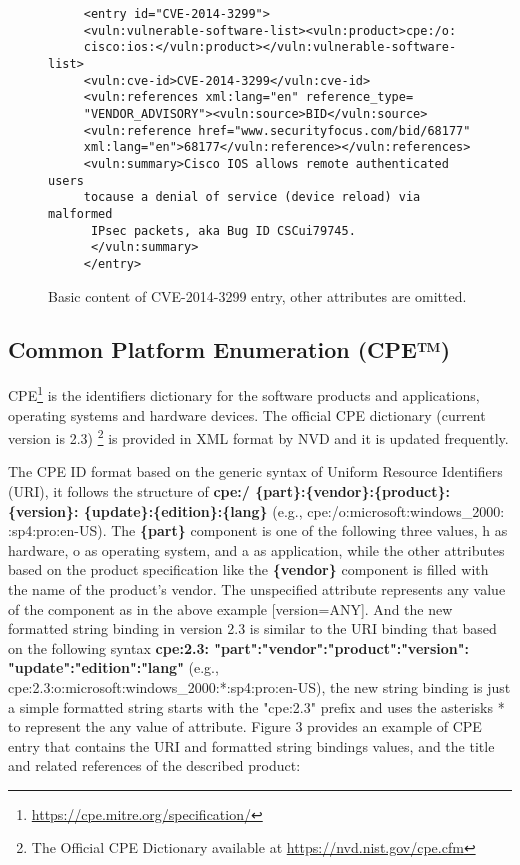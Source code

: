 \documentclass{llncs}
\begin{document}
 \begin{figure}
   
      \lstset{language=XML}
       \begin{lstlisting}
     <entry id="CVE-2014-3299">
     <vuln:vulnerable-software-list><vuln:product>cpe:/o:
     cisco:ios:</vuln:product></vuln:vulnerable-software-list>
     <vuln:cve-id>CVE-2014-3299</vuln:cve-id>
     <vuln:references xml:lang="en" reference_type=
     "VENDOR_ADVISORY"><vuln:source>BID</vuln:source>
     <vuln:reference href="www.securityfocus.com/bid/68177"
     xml:lang="en">68177</vuln:reference></vuln:references>
     <vuln:summary>Cisco IOS allows remote authenticated users 
     tocause a denial of service (device reload) via malformed
      IPsec packets, aka Bug ID CSCui79745.
      </vuln:summary>
     </entry>
       \end{lstlisting}
      \caption{Basic content of CVE-2014-3299 entry, other attributes are omitted.}
       \end{figure}
 
 \subsection{Common Platform Enumeration (CPE™)}
 CPE\footnote{\url{https://cpe.mitre.org/specification/}} is the identifiers dictionary for the software products and applications, operating systems and hardware devices. The official CPE dictionary (current version is 2.3) \footnote{The Official CPE Dictionary available at \url{https://nvd.nist.gov/cpe.cfm}} is provided in XML format by NVD and it is updated frequently.
 \par The CPE ID format based on the generic syntax of Uniform Resource Identifiers (URI), it follows the structure of \textbf{cpe:/ \{part\}:\{vendor\}:\{product\}:
 \{version\}:
 \{update\}:\{edition\}:\{lang\}} (e.g., cpe:/o:microsoft:windows\_2000:
 :sp4:pro:en-US). The \textbf{\{part\}} component is one of the following three values, h as hardware, o as operating system, and a as application, while the other attributes based on the product specification like the \textbf{\{vendor\}} component is filled with the name of the product's vendor. The unspecified attribute represents any value of the component as in the above example [version=ANY]. And  the new formatted string binding in version 2.3  is similar to the URI binding that based on the following syntax \textbf{cpe:2.3: "part":"vendor":"product":"version":
  "update":"edition":"lang"} (e.g., cpe:2.3:o:microsoft:windows\_2000:*:sp4:pro:en-US), the new string binding is just a simple formatted string starts with the  "cpe:2.3" prefix and uses the asterisks * to represent the any value of attribute. Figure 3 provides an example of CPE entry that contains the URI and formatted string bindings values, and the title and related references of the described product: 
  
\end{document}
